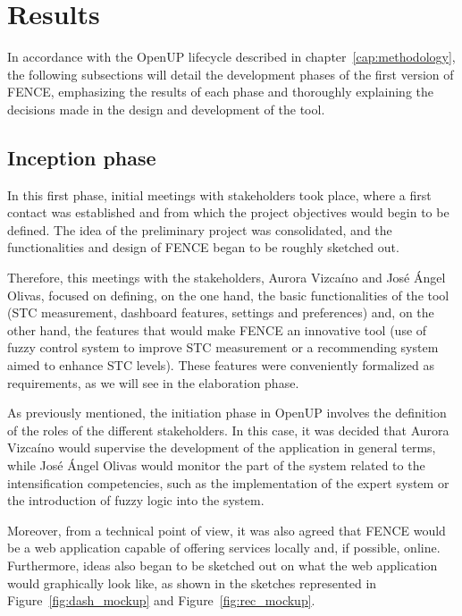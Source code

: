 \chapter{Results}
\label{cap:results}

In accordance with the OpenUP lifecycle described in chapter~\ref{cap:methodology}, the following subsections will detail the development phases of the first version of FENCE, emphasizing the results of each phase and thoroughly explaining the decisions made in the design and development of the tool.

\section{Inception phase}

In this first phase, initial meetings with stakeholders took place, where a first contact was established and from which the project objectives would begin to be defined. The idea of the preliminary project was consolidated, and the functionalities and design of FENCE began to be roughly sketched out.

Therefore, this meetings with the stakeholders, Aurora Vizcaíno and José Ángel Olivas, focused on defining, on the one hand, the basic functionalities of the tool (STC measurement, dashboard features, settings and preferences) and, on the other hand, the features that would make FENCE an innovative tool (use of fuzzy control system to improve STC measurement or a recommending system aimed to enhance STC levels). These features were conveniently formalized as requirements, as we will see in the elaboration phase.

As previously mentioned, the initiation phase in OpenUP involves the definition of the roles of the different stakeholders. In this case, it was decided that Aurora Vizcaíno would supervise the development of the application in general terms, while José Ángel Olivas would monitor the part of the system related to the intensification competencies, such as the implementation of the expert system or the introduction of fuzzy logic into the system.

Moreover, from a technical point of view, it was also agreed that FENCE would be a web application capable of offering services locally and, if possible, online. Furthermore, ideas also began to be sketched out on what the web application would graphically look like, as shown in the sketches represented in Figure~\ref{fig:dash_mockup} and Figure~\ref{fig:rec_mockup}.

